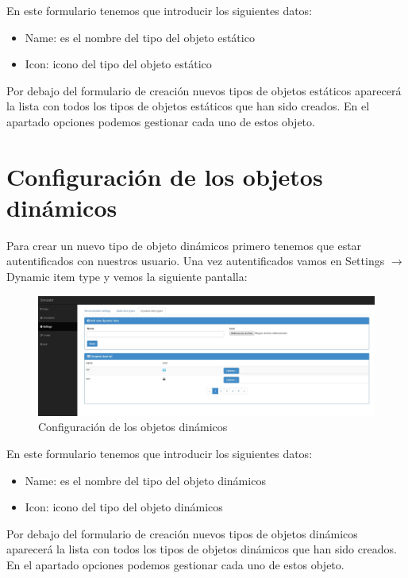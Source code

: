En este formulario tenemos que introducir los siguientes datos:

\begin{itemize}
	\item Name: es el nombre del tipo del objeto estático
	\item Icon: icono del tipo del objeto estático
\end{itemize}	

Por debajo del formulario de creación nuevos tipos de objetos estáticos aparecerá la lista con todos los tipos de objetos estáticos que han sido creados. En el apartado opciones podemos gestionar cada uno de estos objeto.

\section{Configuración de los objetos dinámicos}\label{sec:confObjDinamicos}

Para crear un nuevo tipo de objeto dinámicos primero tenemos que estar autentificados con nuestros usuario. Una vez autentificados vamos en Settings $\rightarrow$ Dynamic item type y vemos la siguiente pantalla:

\begin{figure}[H]
	\centering\includegraphics[scale=0.25]{imagenes/capitulo4/config-objetos-dinamicos.jpg}
	\caption{Configuración de los objetos dinámicos}
	\label{img:ConfiguracionObjetosDinamicos}
\end{figure}

En este formulario tenemos que introducir los siguientes datos:

\begin{itemize}
	\item Name: es el nombre del tipo del objeto dinámicos
	\item Icon: icono del tipo del objeto dinámicos
\end{itemize}

Por debajo del formulario de creación nuevos tipos de objetos dinámicos aparecerá la lista con todos los tipos de objetos dinámicos que han sido creados. En el apartado opciones podemos gestionar cada uno de estos objeto.

